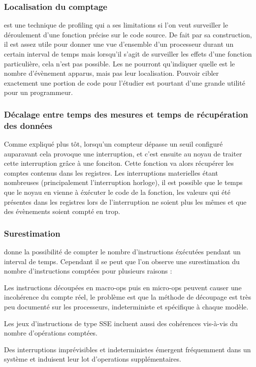 					\subsubsection{Localisation du comptage}
						\PMC est une technique de profiling qui a ses limitations si l'on veut surveiller le déroulement d'une fonction précise sur le code source. De fait par sa construction, il est assez utile pour donner une vue d'ensemble d'un processeur durant un certain interval de temps mais lorsqu'il s'agit de surveiller les effets d'une fonction particulière, cela n'est pas possible. Les \PMC ne pourront qu'indiquer quelle est le nombre d'évènement apparus, mais pas leur localisation. Pouvoir cibler exactement une portion de code pour l'étudier est pourtant d'une grande utilité pour un programmeur.
					\subsubsection{Décalage entre temps des mesures et temps de récupération des données}
						Comme expliqué plus tôt, lorsqu'un compteur dépasse un seuil configuré auparavant cela provoque une interruption, et c'est ensuite au noyau de traiter cette interruption grâce à une fonciton. Cette fonction va alors récupérer les comptes contenus dans les registres. Les interruptions materielles étant nombreuses (principalement l'interruption horloge), il est possible que le temps que le noyau en vienne à éxécuter le code de la fonction, les valeurs qui été présentes dans les registres lors de l'interruption ne soient plus les mêmes et que des évènements soient compté en trop.
					\subsubsection{Surestimation}
						\PMC donne la possibilité de compter le nombre d'instructions éxécutées pendant un interval de temps. Cependant il se peut que l'on observe une surestimation du nombre d'instructions comptées pour plusieurs raisons : 
						\bitem
							\item{Les instructions découpées en macro-ops puis en micro-ops peuvent causer une incohérence du compte réel, le problème est que la méthode de découpage est très peu documenté sur les processeurs, indeterministe et spécifique à chaque modèle.}
							\item{Les jeux d'instructions de type SSE incluent aussi des cohérences vis-à-vis du nombre d'opérations comptées.}
							\item{Des interruptions imprévisibles et indeterministes émergent fréquemment dans un système et induisent leur lot d'operations supplémentaires.}
						\eitem
